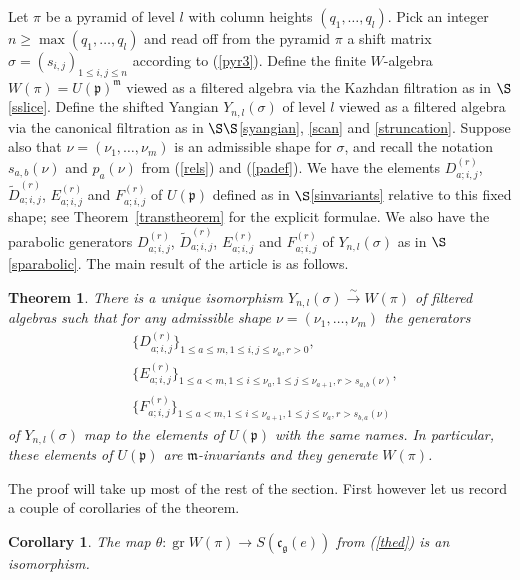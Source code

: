 \documentclass[twoside,12pt,reqno]{amsart}
\newtheorem{Theorem}[Proposition]{Theorem}
\newtheorem{Corollary}[Proposition]{Corollary}
\def\gr{\operatorname{gr}}
\begin{document}
Let $\pi$ be a pyramid of level $l$ with 
column heights $(q_1,\dots,q_l)$. 
Pick an integer $n \geq \max(q_1,\dots,q_l)$ and read off from the pyramid $\pi$ a shift matrix
$\sigma = (s_{i,j})_{1 \leq i,j \leq n}$ according to (\ref{pyr3}).
Define the
finite $W$-algebra $W(\pi) = U(\mathfrak{p})^{\mathfrak{m}}$
viewed as a filtered algebra via the Kazhdan filtration as
in $\S$\ref{sslice}.
Define the shifted Yangian $Y_{n,l}(\sigma)$ of level $l$
viewed as a filtered algebra via the canonical filtration
as in $\S\S$\ref{syangian}, \ref{scan} and \ref{struncation}.
Suppose also that $\nu = (\nu_1,\dots,\nu_m)$ is an admissible
shape for $\sigma$, and recall the notation $s_{a,b}(\nu)$ and $p_a(\nu)$
from (\ref{rels}) and (\ref{padef}).
We have the elements $D_{a;i,j}^{(r)}$,
$\widetilde{D}_{a;i,j}^{(r)}$,
$E_{a;i,j}^{(r)}$ and $F_{a;i,j}^{(r)}$
of $U(\mathfrak{p})$  defined as in $\S$\ref{sinvariants} 
relative to this fixed shape;
see Theorem~\ref{transtheorem} for the explicit formulae.
We also have the parabolic generators
$D_{a;i,j}^{(r)}$,
$\widetilde{D}_{a;i,j}^{(r)}$,
$E_{a;i,j}^{(r)}$ and $F_{a;i,j}^{(r)}$ 
of $Y_{n,l}(\sigma)$ 
as in $\S$\ref{sparabolic}.
The main result of the article is as follows.

\begin{Theorem}\label{main}
There is a unique isomorphism
$Y_{n,l}(\sigma) \stackrel{\sim}{\rightarrow} W(\pi)$ 
of filtered algebras
such that
for any admissible shape $\nu = (\nu_1,\dots,\nu_m)$
the generators
\begin{align*}
&\{D_{a;i,j}^{(r)}\}_{1 \leq a \leq m,
1 \leq i,j \leq \nu_a, r > 0},\\
&\{E_{a;i,j}^{(r)}\}_{1 \leq a < m, 1 \leq i \leq \nu_a,
1 \leq j \leq \nu_{a+1}, r > s_{a,b}(\nu)},\\
&\{F_{a;i,j}^{(r)}\}_{1 \leq a < m, 1 \leq i \leq \nu_{a+1},
1 \leq j \leq \nu_{a}, r > s_{b,a}(\nu)}
\end{align*}
 of $Y_{n,l}(\sigma)$
map to the elements of $U(\mathfrak{p})$ with the same names.
In particular, these elements of $U(\mathfrak{p})$
are $\mathfrak{m}$-invariants and they generate $W(\pi)$.
\end{Theorem}

The proof will take up most of the rest of the section.
First however let us record a couple of corollaries of the theorem.

\begin{Corollary}\label{onto}
The map $\theta:\gr W(\pi) \rightarrow S(\mathfrak{c}_{\mathfrak{g}}(e))$
from (\ref{thed})
is an isomorphism.
\end{Corollary}
\end{document}
